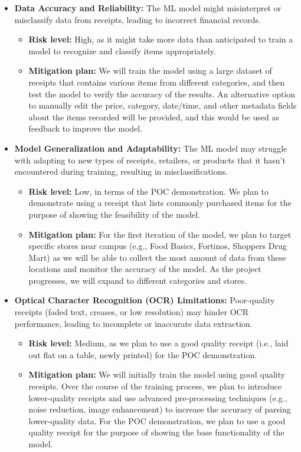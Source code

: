 \documentclass{article}
\begin{document}
\begin{itemize}
    \item \textbf{Data Accuracy and Reliability:} The ML model might misinterpret or misclassify data from receipts, leading to incorrect financial records.
    \begin{itemize}
        \item \textbf{Risk level:} High, as it might take more data than anticipated to train a model to recognize and classify items appropriately.
        \item \textbf{Mitigation plan:} We will train the model using a large dataset of receipts that contains various items from different categories, and then test the model to verify the accuracy of the results. An alternative option to manually edit the price, category, date/time, and other metadata fields about the items recorded will be provided, and this would be used as feedback to improve the model.
    \end{itemize}
    
    \item \textbf{Model Generalization and Adaptability:} The ML model may struggle with adapting to new types of receipts, retailers, or products that it hasn’t encountered during training, resulting in misclassifications.
    \begin{itemize}
        \item \textbf{Risk level:} Low, in terms of the POC demonstration. We plan to demonstrate using a receipt that lists commonly purchased items for the purpose of showing the feasibility of the model.
        \item \textbf{Mitigation plan:} For the first iteration of the model, we plan to target specific stores near campus (e.g., Food Basics, Fortinos, Shoppers Drug Mart) as we will be able to collect the most amount of data from these locations and monitor the accuracy of the model. As the project progresses, we will expand to different categories and stores.
    \end{itemize}
    
    \item \textbf{Optical Character Recognition (OCR) Limitations:} Poor-quality receipts (faded text, creases, or low resolution) may hinder OCR performance, leading to incomplete or inaccurate data extraction.
     \begin{itemize}
         \item \textbf{Risk level:} Medium, as we plan to use a good quality receipt (i.e., laid out flat on a table, newly printed) for the POC demonstration.
        \item \textbf{Mitigation plan:} We will initially train the model using good quality receipts. Over the course of the training process, we plan to introduce lower-quality receipts and use advanced pre-processing techniques (e.g., noise reduction, image enhancement) to increase the accuracy of parsing lower-quality data. For the POC demonstration, we plan to use a good quality receipt for the purpose of showing the base functionality of the model.
      \end{itemize}


\end{itemize}
\end{document}
